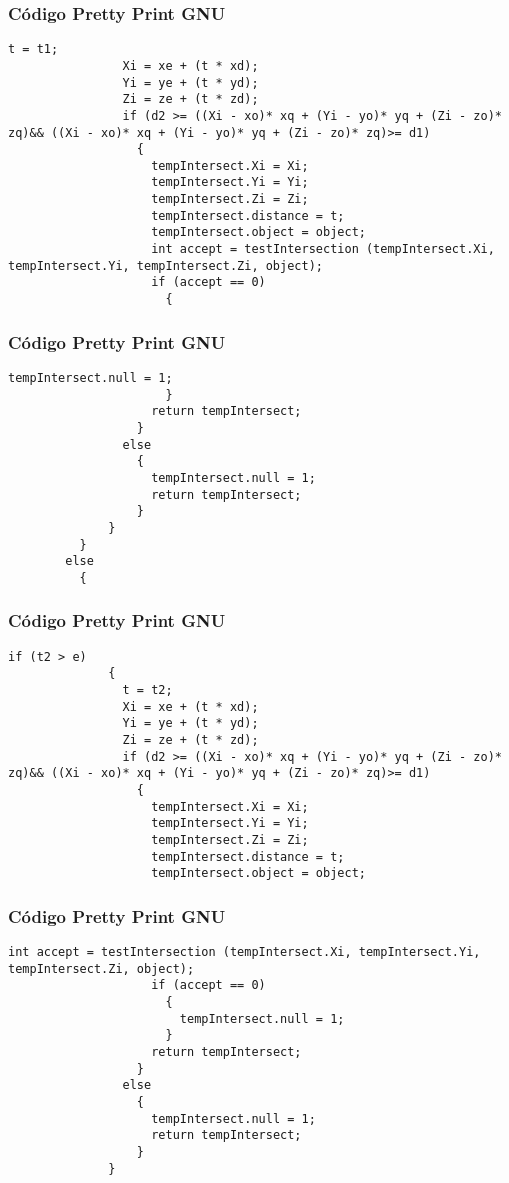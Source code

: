\documentclass{beamer}
\begin{document}
\begin{frame}[fragile]
\frametitle{C\'odigo Pretty Print GNU}
\begin{lstlisting}[style=CStyle]
                t = t1;
                Xi = xe + (t * xd);
                Yi = ye + (t * yd);
                Zi = ze + (t * zd);
                if (d2 >= ((Xi - xo)* xq + (Yi - yo)* yq + (Zi - zo)* zq)&& ((Xi - xo)* xq + (Yi - yo)* yq + (Zi - zo)* zq)>= d1)
                  {
                    tempIntersect.Xi = Xi;
                    tempIntersect.Yi = Yi;
                    tempIntersect.Zi = Zi;
                    tempIntersect.distance = t;
                    tempIntersect.object = object;
                    int accept = testIntersection (tempIntersect.Xi, tempIntersect.Yi, tempIntersect.Zi, object);
                    if (accept == 0)
                      {
                        \end{lstlisting}
\end{frame}
\begin{frame}[fragile]
\frametitle{C\'odigo Pretty Print GNU}
\begin{lstlisting}[style=CStyle]
                        tempIntersect.null = 1;
                      }
                    return tempIntersect;
                  }
                else
                  {
                    tempIntersect.null = 1;
                    return tempIntersect;
                  }
              }
          }
        else
          {
            \end{lstlisting}
\end{frame}
\begin{frame}[fragile]
\frametitle{C\'odigo Pretty Print GNU}
\begin{lstlisting}[style=CStyle]
            if (t2 > e)
              {
                t = t2;
                Xi = xe + (t * xd);
                Yi = ye + (t * yd);
                Zi = ze + (t * zd);
                if (d2 >= ((Xi - xo)* xq + (Yi - yo)* yq + (Zi - zo)* zq)&& ((Xi - xo)* xq + (Yi - yo)* yq + (Zi - zo)* zq)>= d1)
                  {
                    tempIntersect.Xi = Xi;
                    tempIntersect.Yi = Yi;
                    tempIntersect.Zi = Zi;
                    tempIntersect.distance = t;
                    tempIntersect.object = object;
\end{lstlisting}
\end{frame}
\begin{frame}[fragile]
\frametitle{C\'odigo Pretty Print GNU}
\begin{lstlisting}[style=CStyle]
                    int accept = testIntersection (tempIntersect.Xi, tempIntersect.Yi, tempIntersect.Zi, object);
                    if (accept == 0)
                      {
                        tempIntersect.null = 1;
                      }
                    return tempIntersect;
                  }
                else
                  {
                    tempIntersect.null = 1;
                    return tempIntersect;
                  }
              }
\end{lstlisting}
\end{frame}
\end{document}
